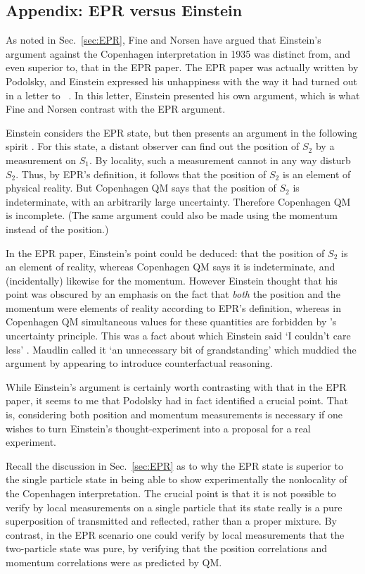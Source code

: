 \documentclass[12pt]{iopart}
\begin{document}
\begin{appendix}
\section*{Appendix: EPR versus Einstein} \label{Sec:app}
As noted in Sec.~\ref{sec:EPR}, Fine \cite{Fin96} and Norsen \cite{Nor05} have argued that Einstein's argument against the Copenhagen interpretation in 1935 was distinct from, and even superior to, that in the EPR paper. The EPR paper was actually written by Podolsky, and Einstein expressed his unhappiness  with the way it had turned out in a letter to \sch\  \cite{Fin96}. In this letter, Einstein presented his own argument, which is what Fine and Norsen contrast with the EPR argument. 

Einstein considers the EPR state, but then presents an argument in the following spirit \cite{Fin96}. For this state, a distant observer can find out the position of $S_2$ by a measurement on $S_1$. By locality, such a measurement cannot in any way disturb $S_2$. Thus, by EPR's definition, it follows that the position of $S_2$ is an element of physical reality. But Copenhagen QM says that the position  of $S_2$ is indeterminate, with an arbitrarily large uncertainty. Therefore Copenhagen QM is incomplete.  (The same argument could also be made using the momentum instead of the position.)

In the EPR paper,  Einstein's point could be deduced: that the position of $S_2$ is an element of reality, whereas  Copenhagen QM says it is indeterminate, and (incidentally) likewise for the momentum.  However Einstein thought that his point was obscured by an emphasis on the fact that {\em both} the position and the momentum were elements of reality according to EPR's definition, whereas in Copenhagen QM simultaneous values for these quantities are forbidden by  \hei's  uncertainty principle. This was a fact about which Einstein said `I couldn't care less' \cite{Fin96}. Maudlin \cite{Mau94} called it `an unnecessary bit of grandstanding' which muddied the argument by appearing to introduce counterfactual reasoning. 
 
While Einstein's argument is certainly worth contrasting with that in the EPR paper, 
it seems to me that Podolsky had in fact identified a crucial point. That is,  considering both 
position and momentum measurements is necessary if one wishes to turn Einstein's  thought-experiment into a proposal for a real experiment.

Recall the discussion in Sec.~\ref{sec:EPR} as to why the EPR state is superior to the single 
particle state in being able to show experimentally the nonlocality of the Copenhagen interpretation. 
The crucial point is that it is not possible to verify by local measurements on a single particle that its
state really is a pure superposition of transmitted and reflected, rather than a proper mixture.   By contrast, in the EPR scenario one could verify by local measurements that the two-particle state was pure, by verifying that the position correlations and momentum correlations were as predicted by QM.  
 

\end{appendix}
\end{document}
